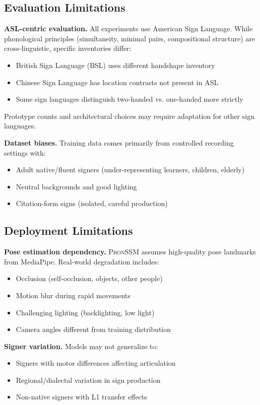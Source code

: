 \documentclass{article}
\theoremstyle{definition}
\theoremstyle{remark}
\newcommand{\phonssm}{\textsc{PhonSSM}}
\begin{document}
\subsection{Evaluation Limitations}

\textbf{ASL-centric evaluation.} All experiments use American Sign Language. While phonological principles (simultaneity, minimal pairs, compositional structure) are cross-linguistic, specific inventories differ:
\begin{itemize}[nosep,topsep=2pt,leftmargin=*]
\item British Sign Language (BSL) uses different handshape inventory
\item Chinese Sign Language has location contrasts not present in ASL
\item Some sign languages distinguish two-handed vs. one-handed more strictly
\end{itemize}
Prototype counts and architectural choices may require adaptation for other sign languages.

\textbf{Dataset biases.} Training data comes primarily from controlled recording settings with:
\begin{itemize}[nosep,topsep=2pt,leftmargin=*]
\item Adult native/fluent signers (under-representing learners, children, elderly)
\item Neutral backgrounds and good lighting
\item Citation-form signs (isolated, careful production)
\end{itemize}

\subsection{Deployment Limitations}

\textbf{Pose estimation dependency.} \phonssm{} assumes high-quality pose landmarks from MediaPipe. Real-world degradation includes:
\begin{itemize}[nosep,topsep=2pt,leftmargin=*]
\item Occlusion (self-occlusion, objects, other people)
\item Motion blur during rapid movements
\item Challenging lighting (backlighting, low light)
\item Camera angles different from training distribution
\end{itemize}

\textbf{Signer variation.} Models may not generalize to:
\begin{itemize}[nosep,topsep=2pt,leftmargin=*]
\item Signers with motor differences affecting articulation
\item Regional/dialectal variation in sign production
\item Non-native signers with L1 transfer effects
\end{itemize}
\end{document}

